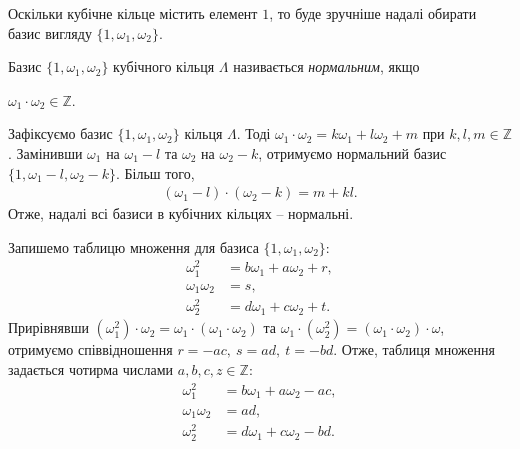 \documentclass{thesis}
\begin{document}
Оскільки кубічне кільце містить елемент $1$, то буде зручніше надалі обирати базис вигляду $\{1,\omega_1,\omega_2\}$.

\begin{definition}
Базис $\{1,\omega_1,\omega_2\}$ кубічного кільця $\Lambda$ називається \textit{нормальним}, якщо
\begin{center}
$\omega_1 \cdot \omega_2 \in \mathbb{Z}$.
\end{center}
\end{definition}

\begin{remark}
Зафіксуємо базис $\{1,\omega_1,\omega_2\}$ кільця $\Lambda$. Тоді $\omega_1 \cdot \omega_2 = k \omega_1 + l \omega_2 + m$ при $k,l,m \in \mathbb{Z}$. Замінивши $\omega_1$ на $\omega_1-l$ та $\omega_2$ на $\omega_2 - k$, отримуємо нормальний базис $\{1,\omega_1 - l, \omega_2 - k\}$. Більш того,
\begin{align*}
(\omega_1 - l) \cdot (\omega_2 - k) = m + kl.
\end{align*}
Отже, надалі всі базиси в кубічних кільцях -- нормальні.
\end{remark}

Запишемо таблицю множення для базиса $\{1,\omega_1,\omega_2\}$:
\begin{align*}
\omega_1^2 & = b \omega_1 + a \omega_2 + r, \\
\omega_1 \omega_2 & = s, \\
\omega_2^2 & = d \omega_1 + c \omega_2 + t.
\end{align*}
Прирівнявши $(\omega_1^2) \cdot \omega_2 = \omega_1 \cdot (\omega_1 \cdot \omega_2)$ та $\omega_1 \cdot (\omega_2^2) = (\omega_1 \cdot \omega_2) \cdot \omega$, отримуємо співвідношення $r = -ac,\ s = ad,\ t = -bd$. Отже, таблиця множення задається чотирма числами $a,b,c,z \in \mathbb{Z}$:
\begin{align*}
\omega_1^2 & = b \omega_1 + a \omega_2 - ac, \\
\omega_1 \omega_2 & = ad, \\
\omega_2^2 & = d \omega_1 + c \omega_2 -bd.
\end{align*}
\end{document}
